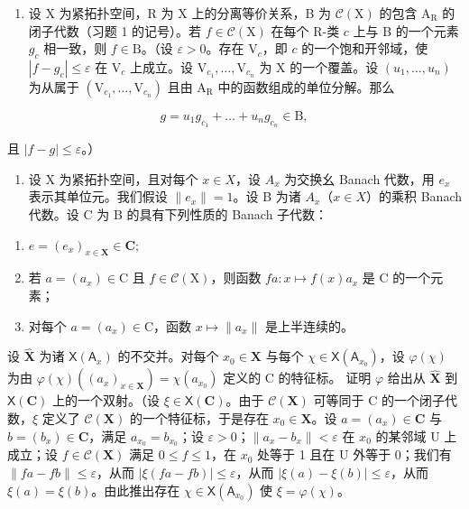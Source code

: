 \begin{enumerate}
\def\labelenumi{\arabic{enumi})}
\setcounter{enumi}{1}
\tightlist
\item
  设 X 为紧拓扑空间，R 为 X 上的分离等价关系，B 为 \(\mathcal{C}(\mathrm{X})\) 的包含 \(\mathrm{A}_{\mathrm{R}}\) 的闭子代数（习题 1 的记号）。若 \(f \in \mathcal{C}(\mathrm{X})\) 在每个 R-类 \(c\) 上与 B 的一个元素 \(g_{c}\) 相一致，则 \(f \in \mathrm{B}\)。（设 \(\varepsilon > 0\)。存在 \(\mathrm{V}_{c}\)，即 \(c\) 的一个饱和开邻域，使 \(|f - g_{c}| \leqslant \varepsilon\) 在 \(\mathrm{V}_{c}\) 上成立。设 \(\mathrm{V}_{c_{1}}, \ldots, \mathrm{V}_{c_{n}}\) 为 X 的一个覆盖。设 \((u_{1}, \ldots, u_{n})\) 为从属于 \((\mathrm{V}_{c_{1}}, \ldots, \mathrm{V}_{c_{n}})\) 且由 \(\mathrm{A}_{\mathrm{R}}\) 中的函数组成的单位分解。那么
\end{enumerate}

\[
g = u _ {1} g _ {c _ {1}} + \dots + u _ {n} g _ {c _ {n}} \in \mathrm{B},
\]

且 \(|f - g| \leqslant \varepsilon\)。）

\begin{enumerate}
\def\labelenumi{\arabic{enumi})}
\setcounter{enumi}{2}
\tightlist
\item
  设 X 为紧拓扑空间，且对每个 \(x \in X\)，设 \(A_{x}\) 为交换幺 Banach 代数，用 \(e_{x}\) 表示其单位元。我们假设 \(\|e_{x}\| = 1\)。设 B 为诸 \(A_{x}\)（\(x \in X\)）的乘积 Banach 代数。设 C 为 B 的具有下列性质的 Banach 子代数：
\end{enumerate}

\begin{enumerate}
\def\labelenumi{(\roman{enumi})}
\item
  \(e = (e_x)_{x \in \mathbf{X}} \in \mathbf{C};\)
\item
  若 \(a = (a_x) \in \mathrm{C}\) 且 \(f \in \mathcal{C}(\mathrm{X})\)，则函数 \(fa: x \mapsto f(x)a_x\) 是 \(\mathrm{C}\) 的一个元素；
\item
  对每个 \(a = (a_x) \in \mathrm{C}\)，函数 \(x \mapsto \|a_x\|\) 是上半连续的。
\end{enumerate}

设 \(\widehat{\mathbf{X}}\) 为诸 \(\mathsf{X}(\mathsf{A}_x)\) 的不交并。对每个 \(x_0 \in \mathbf{X}\) 与每个 \(\chi \in \mathsf{X}(\mathsf{A}_{x_0})\)，设 \(\varphi(\chi)\) 为由 \(\varphi(\chi)((a_x)_{x \in \mathbf{X}}) = \chi(a_{x_0})\) 定义的 C 的特征标。 证明 \(\varphi\) 给出从 \(\widehat{\mathbf{X}}\) 到 \(\mathsf{X}(\mathbf{C})\) 上的一个双射。（设 \(\xi \in \mathsf{X}(\mathbf{C})\)。由于 \(\mathcal{C}(\mathbf{X})\) 可等同于 C 的一个闭子代数，\(\xi\) 定义了 \(\mathcal{C}(\mathbf{X})\) 的一个特征标，于是存在 \(x_0 \in \mathbf{X}\)。设 \(a = (a_x) \in \mathbf{C}\) 与 \(b = (b_x) \in \mathbf{C}\)，满足 \(a_{x_0} = b_{x_0}\)；设 \(\varepsilon > 0\)；\(\|a_x - b_x\| < \varepsilon\) 在 \(x_0\) 的某邻域 U 上成立；设 \(f \in \mathcal{C}(\mathbf{X})\) 满足 \(0 \leqslant f \leqslant 1\)，在 \(x_0\) 处等于 1 且在 U 外等于 0；我们有 \(\|fa - fb\| \leqslant \varepsilon\)，从而 \(|\xi(fa - fb)| \leqslant \varepsilon\)，从而 \(|\xi(a) - \xi(b)| \leqslant \varepsilon\)，从而 \(\xi(a) = \xi(b)\)。由此推出存在 \(\chi \in \mathsf{X}(\mathsf{A}_{x_0})\) 使 \(\xi = \varphi(\chi)\)。

